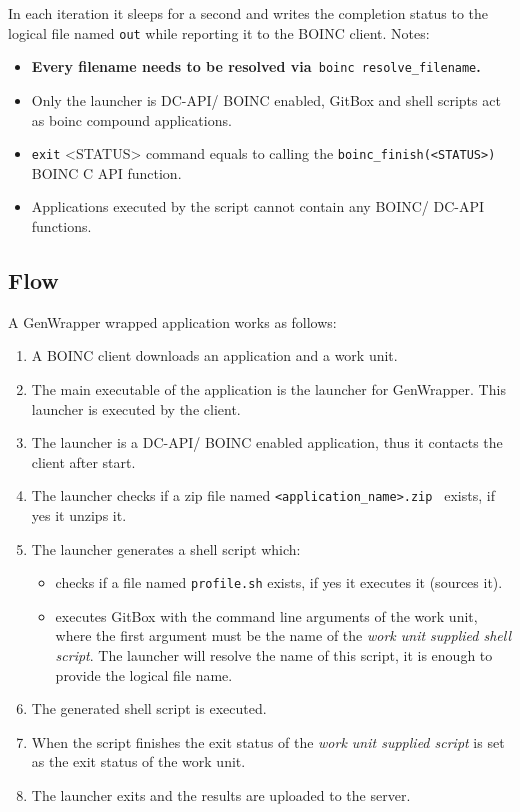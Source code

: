 \documentclass[a4paper,12pt,titlepage,dvipdfm]{article}
\begin{document}
In each iteration it sleeps for a second and writes the completion status to the logical file named \texttt{out} while reporting it to the BOINC client. Notes:
\begin{itemize}
    \item \textbf{Every filename needs to be resolved via}\texttt{ boinc resolve\_filename}\textbf{.}
    \item Only the launcher is DC-API/ BOINC enabled, GitBox and shell scripts act as boinc compound applications.
    \item \texttt{exit} <STATUS> command equals to calling the \texttt{boinc\_finish(<STATUS>)} BOINC C API function.
    \item Applications executed by the script cannot contain any BOINC/ DC-API functions.
\end{itemize}

\subsection{Flow}

A GenWrapper wrapped application works as follows:
\begin{enumerate}
    \item A BOINC client downloads an application and a work unit.
    \item The main executable of the application is the launcher for GenWrapper. This launcher is executed by the client.
    \item The launcher is a DC-API/ BOINC enabled application, thus it contacts the client after start.
    \item The launcher checks if a zip file named \texttt{<application\_name>.zip } exists, if yes it unzips it.
    \item The launcher generates a shell script which:
        \begin{itemize}
            \item checks if a file named \texttt{profile.sh} exists, if yes it executes it (sources it).
            \item executes GitBox with the command line arguments of the work unit, where the first argument must be the name of the \emph{work unit supplied shell script}. The launcher will resolve the name of this script, it is enough to provide the logical file name.
        \end{itemize}
    
    \item The generated shell script is executed.
    \item When the script finishes the exit status of the \emph{work unit supplied script} is set as the exit status of the work unit.
    \item The launcher exits and the results are uploaded to the server.
\end{enumerate}
\end{document}
